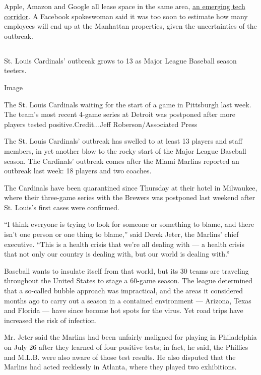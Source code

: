 Apple, Amazon and Google all lease space in the same area,
\href{https://www.nytimes.com/2020/01/05/nyregion/nyc-tech-facebook-amazon-google.html}{an
emerging tech corridor}. A Facebook spokeswoman said it was too soon to
estimate how many employees will end up at the Manhattan properties,
given the uncertainties of the outbreak.

\hypertarget{-8}{%
\subsection{}\label{-8}}

St. Louis Cardinals' outbreak grows to 13 as Major League Baseball
season teeters.

Image

The St. Louis Cardinals waiting for the start of a game in Pittsburgh
last week. The team's most recent 4-game series at Detroit was postponed
after more players tested positive.Credit...Jeff Roberson/Associated
Press

The St. Louis Cardinals' outbreak has swelled to at least 13 players and
staff members, in yet another blow to the rocky start of the Major
League Baseball season. The Cardinals' outbreak comes after the Miami
Marlins reported an outbreak last week: 18 players and two coaches.

The Cardinals have been quarantined since Thursday at their hotel in
Milwaukee, where their three-game series with the Brewers was postponed
last weekend after St. Louis's first cases were confirmed.

``I think everyone is trying to look for someone or something to blame,
and there isn't one person or one thing to blame,'' said Derek Jeter,
the Marlins' chief executive. ``This is a health crisis that we're all
dealing with --- a health crisis that not only our country is dealing
with, but our world is dealing with.''

Baseball wants to insulate itself from that world, but its 30 teams are
traveling throughout the United States to stage a 60-game season. The
league determined that a so-called bubble approach was impractical, and
the areas it considered months ago to carry out a season in a contained
environment --- Arizona, Texas and Florida --- have since become hot
spots for the virus. Yet road trips have increased the risk of
infection.

Mr. Jeter said the Marlins had been unfairly maligned for playing in
Philadelphia on July 26 after they learned of four positive tests; in
fact, he said, the Phillies and M.L.B. were also aware of those test
results. He also disputed that the Marlins had acted recklessly in
Atlanta, where they played two exhibitions.

